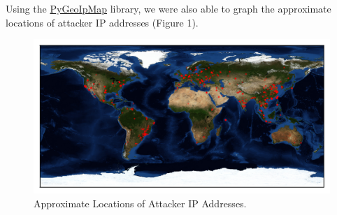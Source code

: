Using the \href{https://github.com/pieqq/PyGeoIpMap}{PyGeoIpMap} library, we were also able to graph the approximate locations of attacker IP addresses (Figure 1).

\begin{figure}[H]
	\includegraphics[width=\linewidth]{output.png}
	\caption{Approximate Locations of Attacker IP Addresses.}
	\label{fig:map}
\end{figure}
